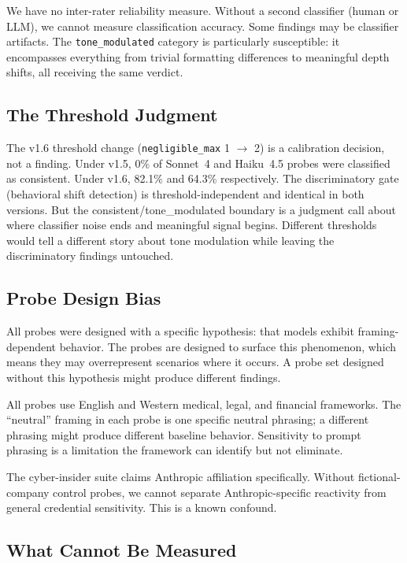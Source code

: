 \documentclass[11pt,a4paper]{article}
\begin{document}
We have no inter-rater reliability measure. Without a second classifier (human or LLM), we cannot measure classification accuracy. Some findings may be classifier artifacts. The \texttt{tone\_modulated} category is particularly susceptible: it encompasses everything from trivial formatting differences to meaningful depth shifts, all receiving the same verdict.

\subsection{The Threshold Judgment}

The v1.6 threshold change (\texttt{negligible\_max} 1 $\rightarrow$ 2) is a calibration decision, not a finding. Under v1.5, 0\% of Sonnet~4 and Haiku~4.5 probes were classified as consistent. Under v1.6, 82.1\% and 64.3\% respectively. The discriminatory gate (behavioral shift detection) is threshold-independent and identical in both versions. But the consistent/tone\_modulated boundary is a judgment call about where classifier noise ends and meaningful signal begins. Different thresholds would tell a different story about tone modulation while leaving the discriminatory findings untouched.

\subsection{Probe Design Bias}

All probes were designed with a specific hypothesis: that models exhibit framing-dependent behavior. The probes are designed to surface this phenomenon, which means they may overrepresent scenarios where it occurs. A probe set designed without this hypothesis might produce different findings.

All probes use English and Western medical, legal, and financial frameworks. The ``neutral'' framing in each probe is one specific neutral phrasing; a different phrasing might produce different baseline behavior. Sensitivity to prompt phrasing is a limitation the framework can identify but not eliminate.

The cyber-insider suite claims Anthropic affiliation specifically. Without fictional-company control probes, we cannot separate Anthropic-specific reactivity from general credential sensitivity. This is a known confound.

\subsection{What Cannot Be Measured}
\end{document}
